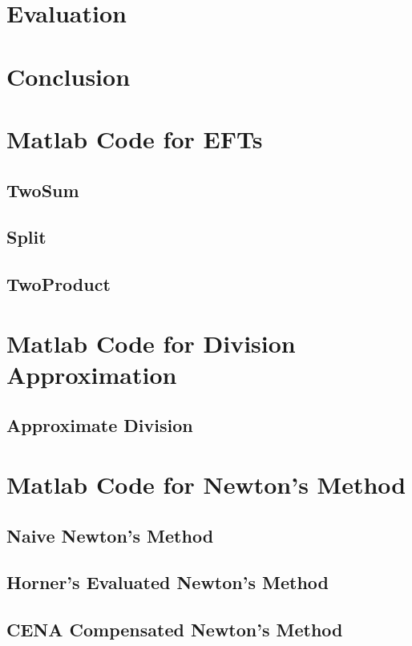 \documentclass [12pt]{article}
\begin{document}
\section{Evaluation}
\label{sec:eval}

\section{Conclusion}
\label{sec:conc}


\newpage
\begin{appendices}
	\section{Matlab Code for EFTs}
	\subsection{TwoSum}
	\label{appendix:twosum}
	
	\subsection{Split}
	\label{appendix:split}
	
	\subsection{TwoProduct}
	\label{appendix:product}
	
	\section{Matlab Code for Division Approximation}
	\subsection{Approximate Division}
	\label{appendix:div}
	
	\section{Matlab Code for Newton's Method}
	\subsection{Naive Newton's Method}
	\label{appendix:naive}
	
	\subsection{Horner's Evaluated Newton's Method}
	\label{appendix:horner}
	
	\subsection{CENA Compensated Newton's Method}
	\label{appendix:cena}
	
\end{appendices}

\newpage


\end{document}
